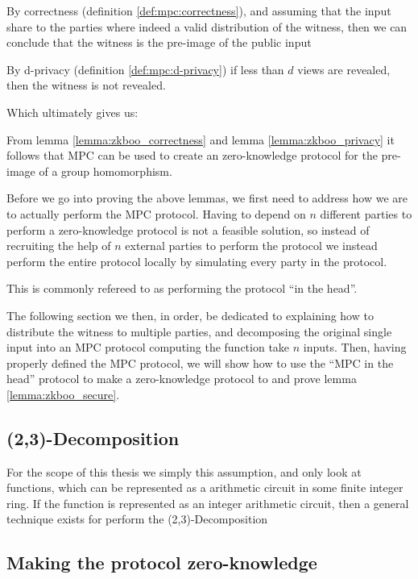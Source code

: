 \begin{lemma}
\label{lemma:zkboo_correctness}
By correctness (definition \ref{def:mpc:correctness}), and assuming that
the input share to the parties where indeed a valid distribution of the
witness, then we can conclude that the witness is the pre-image of the public input
\end{lemma}

\begin{lemma}
\label{lemma:zkboo_privacy}
By d-privacy (definition \ref{def:mpc:d-privacy}) if less than $d$ views are
revealed, then the witness is not revealed.
\end{lemma}

Which ultimately gives us:

\begin{lemma}
\label{lemma:zkboo_secure}
From lemma \ref{lemma:zkboo_correctness} and lemma \ref{lemma:zkboo_privacy} it
follows that MPC can be used to create an zero-knowledge protocol for the
pre-image of a group homomorphism.
\end{lemma}

Before we go into proving the above lemmas, we first need to address how we are
to actually perform the MPC protocol. Having to depend on $n$ different parties
to perform a zero-knowledge protocol is not a feasible solution, so instead of
recruiting the help of $n$ external parties to perform the protocol we instead
perform the entire protocol locally by simulating every party in the protocol.

This is commonly refereed to as performing the protocol ``in the head''.


The following section we then, in order, be dedicated to explaining how to
distribute the witness to multiple parties, and decomposing the original single
input into an MPC protocol computing the function take $n$ inputs. Then, having
properly defined the MPC protocol, we will show how to use the ``MPC in the
head'' protocol to make a zero-knowledge protocol to and prove lemma \ref{lemma:zkboo_secure}.

\subsection{(2,3)-Decomposition}
\label{subsec:decomposition}



For the scope of this thesis we simply this assumption, and only look at
functions, which can be represented as a arithmetic circuit in some finite
integer ring. If the function is represented as an integer arithmetic circuit,
then a general technique exists for perform the (2,3)-Decomposition


\subsection{Making the protocol zero-knowledge}
\label{subsec:zkboo_sigma}





